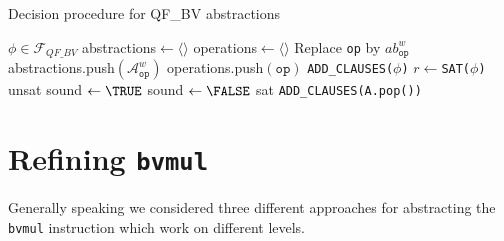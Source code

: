 \begin{algorithm}
    \caption{Decision procedure for QF\_BV abstractions}
    \begin{algorithmic}
    \label{algorithm:refinement_approach:abstraction_scheme:refinement}
    \REQUIRE $\phi \in \mathcal{F}_{QF\_BV}$
    \STATE abstractions$ \leftarrow \langle\rangle$
    \STATE operations$ \leftarrow \langle\rangle$
            \STATE Replace \texttt{op} by $ab_\texttt{op}^w$
            \STATE abstractions.push$\left(\mathcal{A}_\texttt{op}^w\right)$
            \STATE operations.push$\left(\texttt{op}\right)$
        \ENDIF
    \ENDFOR
    \STATE \texttt{ADD\_CLAUSES($\phi$)}
    \LOOP
    \STATE $r \leftarrow $\texttt{SAT($\phi$)}
        \PRINT unsat
    \ELSE
        \STATE sound $\leftarrow \TRUE$
                \STATE sound $\leftarrow \FALSE$
            \ENDIF
        \ENDFOR
            \PRINT sat
        \ELSE
                \STATE \texttt{ADD\_CLAUSES(A.pop())}
            \ENDFOR
        \ENDIF
    \ENDIF
    \ENDLOOP
    \end{algorithmic}
\end{algorithm}

\section{Refining \texttt{bvmul}}
\label{sec:refinement_approach:bvmul}
Generally speaking we considered three different approaches for abstracting the \texttt{bvmul} instruction which work on different levels.
